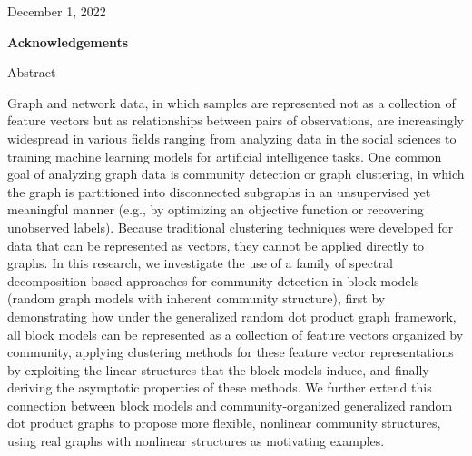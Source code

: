 \documentclass[
  12pt,
]{article}
\theoremstyle{definition}
\theoremstyle{definition}
\theoremstyle{definition}
\theoremstyle{definition}
\theoremstyle{remark}
\begin{document}
\vspace*{16\baselineskip}

\raggedright

December 1, 2022

\newpage

\doublespacing

\begin{center}
\LARGE{\bf{Acknowledgements}}
\end{center}

\hypersetup{linkcolor = black}

\newpage

\begin{center}
\LARGE{Abstract}
\end{center}

\vspace*{2\baselineskip}

\normalsize

Graph and network data, in which samples are represented not as a collection of feature vectors but as relationships between pairs of observations, are increasingly widespread in various fields ranging from analyzing data in the social sciences to training machine learning models for artificial intelligence tasks. 
One common goal of analyzing graph data is community detection or graph clustering, in which the graph is partitioned into disconnected subgraphs in an unsupervised yet meaningful manner (e.g., by optimizing an objective function or recovering unobserved labels). 
Because traditional clustering techniques were developed for data that can be represented as vectors, they cannot be applied directly to graphs. 
In this research, we investigate the use of a family of spectral decomposition based approaches for community detection in block models (random graph models with inherent community structure), first by demonstrating how under the generalized random dot product graph framework, all block models can be represented as a collection of feature vectors organized by community, applying clustering methods for these feature vector representations by exploiting the linear structures that the block models induce, and finally deriving the asymptotic properties of these methods. 
We further extend this connection between block models and community-organized generalized random dot product graphs to propose more flexible, nonlinear community structures, using real graphs with nonlinear structures as motivating examples. 

\newpage

\end{document}
